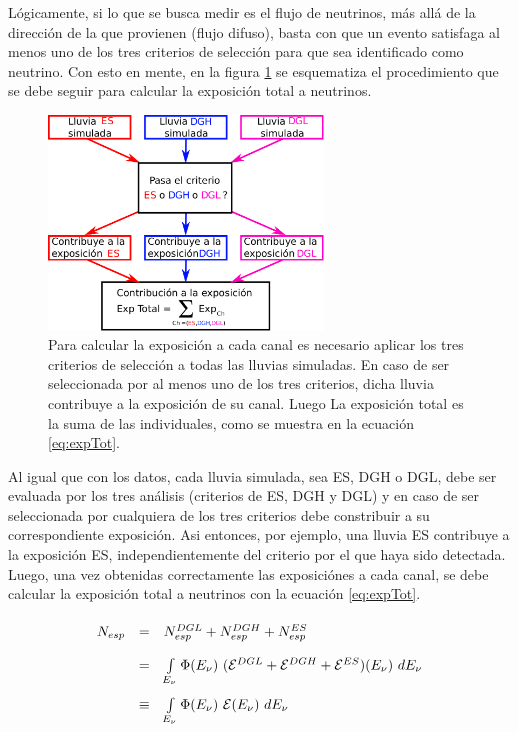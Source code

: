	L\'ogicamente, si lo que se busca medir es el flujo de neutrinos, m\'as all\'a de la dirección de la que provienen (flujo difuso), basta con que un evento satisfaga al menos uno de los tres criterios de selección para que sea identificado como neutrino.
	Con esto en mente, en la figura \ref{fig:sketch_combined} se esquematiza el procedimiento que se debe seguir para calcular la exposición total a neutrinos.
	\begin{figure}[ht!]
		\begin{center}
			\includegraphics[width=0.65\textwidth]{fig/resultadosAuger/sketch_combined_5}
			\caption{Para calcular la exposición a cada canal es necesario aplicar los tres criterios de selección a todas las lluvias simuladas. En caso de ser seleccionada por al menos uno de los tres criterios, dicha lluvia contribuye a la exposición de su canal. Luego La exposición total es la suma de las individuales, como se muestra en la ecuación \ref{eq:expTot}.}
			\label{fig:sketch_combined}
		\end{center}
	\end{figure}
	Al igual que con los datos, cada lluvia simulada, sea ES, DGH o DGL, debe ser evaluada por los tres análisis (criterios de ES, DGH y DGL) y en caso de ser seleccionada por cualquiera de los tres criterios debe constribuir a su correspondiente exposición.
	Asi entonces, por ejemplo, una lluvia ES contribuye a la exposici\'on ES, independientemente del criterio por el que haya sido detectada.
	Luego, una vez obtenidas correctamente las exposiciónes a cada canal, se debe calcular la exposición total a neutrinos con la ecuación \ref{eq:expTot}.
	\begin{equation}\renewcommand{\arraystretch}{2}
	\begin{array}{rcl}
	 N_{esp}& =& N_{esp}^{DGL}+N_{esp}^{DGH}+N_{esp}^{ES} \\
	 & = & \int\limits_{E_\nu}\Phi(E_\nu)~({\cal E}^{DGL}+{\cal E}^{DGH}+{\cal E}^{ES})(E_\nu)~dE_\nu\\
	 & \equiv & \int\limits_{E_\nu}\Phi(E_\nu)~{\cal E}(E_\nu)~dE_\nu
	\end{array}
	\label{eq:expTot}
	\end{equation}
	
